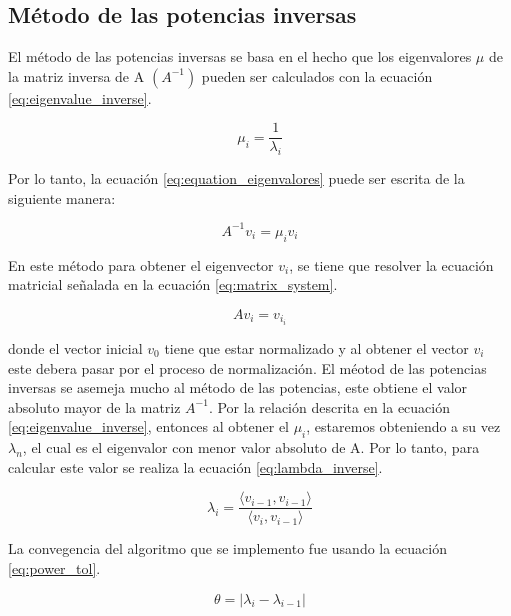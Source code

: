 \subsection{Método de las potencias inversas}

El método de las potencias inversas se basa en el hecho que los eigenvalores $\mu$ de la matriz inversa de A $(A^{-1})$ pueden ser calculados con la ecuación \ref{eq:eigenvalue_inverse}.

\begin{equation}
    \mu_i = \frac{1}{\lambda_i} \label{eq:eigenvalue_inverse}
\end{equation}

Por lo tanto, la ecuación \ref{eq:equation_eigenvalores} puede ser escrita de la siguiente manera:

\begin{equation}
    A^{-1} v_i = \mu_i  v_i
\end{equation}

En este método para obtener el eigenvector $v_i$, se tiene que resolver la ecuación matricial señalada en la ecuación \ref{eq:matrix_system}.

\begin{equation}
    Av_{i} = v_{i_i} \label{eq:matrix_system}
\end{equation}

donde el vector inicial $v_0$ tiene que estar normalizado y al obtener el vector $v_{i}$ este debera pasar por el proceso de normalización. El méotod de las potencias inversas se asemeja mucho al método de las potencias, este obtiene el valor absoluto mayor de la matriz $A^{-1}$. Por la relación descrita en la ecuación \ref{eq:eigenvalue_inverse}, entonces al obtener el $\mu_i$, estaremos obteniendo a su vez $\lambda_n$, el cual es el eigenvalor con menor valor absoluto de A. Por lo tanto, para calcular este valor se realiza la ecuación \ref{eq:lambda_inverse}.

\begin{equation}
    \lambda_i = \frac{\langle v_{i-1}, v_{i-1}\rangle}{\langle v_i , v_{i-1}\rangle} \label{eq:lambda_inverse}
\end{equation}

La convegencia del algoritmo que se implemento fue usando la ecuación \ref{eq:power_tol}.

\begin{equation}
    \theta = |\lambda_i - \lambda_{i-1}| \label{eq:power_tol}
\end{equation}

